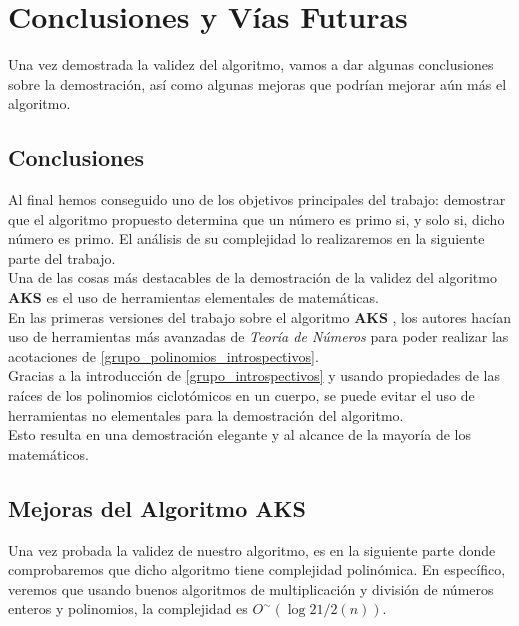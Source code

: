 \chapter{Conclusiones y Vías Futuras}

Una vez demostrada la validez del algoritmo, vamos a dar algunas conclusiones sobre la demostración, así como algunas mejoras que podrían mejorar aún más el algoritmo.

\section{Conclusiones}

Al final hemos conseguido uno de los objetivos principales del trabajo: demostrar que el algoritmo propuesto determina que un número es primo si, y solo si, dicho número es primo. El análisis de su complejidad lo realizaremos en la siguiente parte del trabajo.\\

Una de las cosas más destacables de la demostración de la validez del algoritmo \textbf{AKS} es el uso de herramientas elementales de matemáticas.\\

En las primeras versiones del trabajo sobre el algoritmo \textbf{AKS} \cite{primes_is_in_p}, los autores hacían uso de herramientas más avanzadas de \textit{Teoría de Números} para poder realizar las acotaciones de \eqref{grupo_polinomios_introspectivos}.\\

Gracias a la introducción de \eqref{grupo_introspectivos} y usando propiedades de las raíces de los polinomios ciclotómicos en un cuerpo, se puede evitar el uso de herramientas no elementales para la demostración del algoritmo.\\

Esto resulta en una demostración elegante y al alcance de la mayoría de los matemáticos.

\section{Mejoras del Algoritmo AKS}

Una vez probada la validez de nuestro algoritmo, es en la siguiente parte donde comprobaremos que dicho algoritmo tiene complejidad polinómica. En específico, veremos que usando buenos algoritmos de multiplicación y división de números enteros y polinomios, la complejidad es $O^\sim(\log{21/2}(n))$.\\

